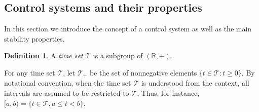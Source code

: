 \documentclass[twocolumn]{IEEEtran} %
\theoremstyle{definition}
\newtheorem{definition}[theorem]{Definition}
\newcommand{\R}{\mathbb{R}}%
\newcommand{\T}{\ensuremath{\mathcal{T}}}  %
\begin{document}
\subsection{Control systems and their properties}
\label{sec:Control systems and their properties}

In this section we introduce the concept of a control system as well as the main stability properties.
\begin{definition}
\label{def:Time-set} 
A \emph{time set} $\T$ is a subgroup of $(\R, +)$.
\end{definition}

For any time set $\T$, let $\T_+$ be the set of nonnegative elements $\{t \in \T: t \geq 0\}$. 
By notational convention, when the time set $\T$ is understood from the context, all
intervals are assumed to be restricted to $\T$. Thus, for instance,
$[a, b) = \{t \in \T , a \leq t < b\}$.
\end{document}
